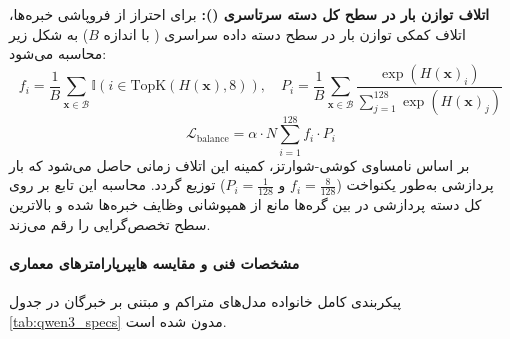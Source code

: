 \textbf{اتلاف توازن بار در سطح کل دسته سرتاسری ():}
برای احتراز از فروپاشی خبره‌ها، اتلاف کمکی توازن بار \cite{qiu2025demons} در سطح دسته داده سراسری ( با اندازه $B$) به شکل زیر محاسبه می‌شود:
\begin{equation}
    f_i = \frac{1}{B} \sum_{\mathbf{x} \in \mathcal{B}} \mathbb{I}(i \in \text{TopK}(H(\mathbf{x}), 8)), \quad P_i = \frac{1}{B} \sum_{\mathbf{x} \in \mathcal{B}} \frac{\exp(H(\mathbf{x})_i)}{\sum_{j=1}^{128} \exp(H(\mathbf{x})_j)}
\end{equation}
\begin{equation}
    \mathcal{L}_{\text{balance}} = \alpha \cdot N \sum_{i=1}^{128} f_i \cdot P_i
\end{equation}
بر اساس نامساوی کوشی-شوارتز، کمینه این اتلاف زمانی حاصل می‌شود که بار پردازشی به‌طور یکنواخت ($f_i = \frac{8}{128}$ و $P_i = \frac{1}{128}$) توزیع گردد. محاسبه این تابع بر روی کل دسته پردازشی در بین گره‌ها مانع از همپوشانی وظایف خبره‌ها شده و بالاترین سطح تخصص‌گرایی را رقم می‌زند.

\paragraph*{مشخصات فنی و مقایسه هایپرپارامترهای معماری}
پیکربندی کامل خانواده مدل‌های متراکم و مبتنی بر خبرگان  در جدول \ref{tab:qwen3_specs} مدون شده است.

\begin{table}[htbp]
\centering
\caption{مشخصات و پیکربندی هایپرپارامترهای معماری ترنسفورمر در خانواده مدل‌های }
\label{tab:qwen3_specs}
\end{table}